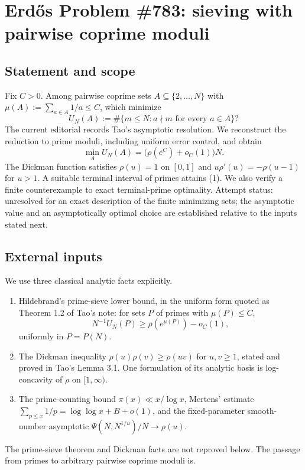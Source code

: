 \section*{Erd\H{o}s Problem \#783: sieving with pairwise coprime moduli}
\subsection*{Statement and scope}
Fix \(C>0\). Among pairwise coprime sets \(A\subseteq\{2,\ldots,N\}\) with
\(\mu(A):=\sum_{a\in A}1/a\leq C\), which minimize
\[
U_N(A):=\#\{m\leq N:a\nmid m\text{ for every }a\in A\}?
\]
The current editorial records Tao's asymptotic resolution. We reconstruct the reduction to prime moduli, including uniform error control, and obtain
\[
\min_A U_N(A)=\bigl(\rho(e^C)+o_C(1)\bigr)N. \tag{1}
\]
The Dickman function satisfies \(\rho(u)=1\) on \([0,1]\) and
\(u\rho'(u)=-\rho(u-1)\) for \(u>1\). A suitable terminal interval of primes attains (1). We also verify a finite counterexample to exact terminal-prime optimality. Attempt status: unresolved for an exact description of the finite minimizing sets; the asymptotic value and an asymptotically optimal choice are established relative to the inputs stated next.

\subsection*{External inputs}
We use three classical analytic facts explicitly.
\begin{enumerate}
\item Hildebrand's prime-sieve lower bound, in the uniform form quoted as Theorem 1.2 of Tao's note: for sets \(P\) of primes with \(\mu(P)\leq C\),
\[
N^{-1}U_N(P)\geq\rho(e^{\mu(P)})-o_C(1),
\]
uniformly in \(P=P(N)\).
\item The Dickman inequality \(\rho(u)\rho(v)\geq\rho(uv)\) for \(u,v\geq1\), stated and proved in Tao's Lemma 3.1. One formulation of its analytic basis is log-concavity of \(\rho\) on \([1,\infty)\).
\item The prime-counting bound \(\pi(x)\ll x/\log x\), Mertens' estimate
\(\sum_{p\leq x}1/p=\log\log x+B+o(1)\), and the fixed-parameter smooth-number asymptotic
\(\Psi(N,N^{1/u})/N\to\rho(u)\).
\end{enumerate}
The prime-sieve theorem and Dickman facts are not reproved below. The passage from primes to arbitrary pairwise coprime moduli is.

